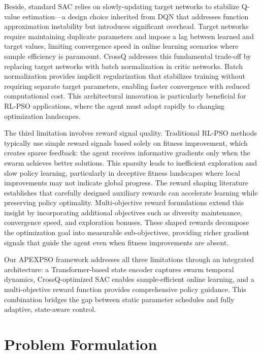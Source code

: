 \documentclass[fleqn,10pt]{wlscirep}
\begin{document}
Beside, standard SAC relies on slowly-updating target networks to stabilize Q-value estimation---a design choice inherited from DQN \cite{mnih2015dqn} that addresses function approximation instability but introduces significant overhead.
Target networks require maintaining duplicate parameters and impose a lag between learned and target values, limiting convergence speed in online learning scenarios where sample efficiency is paramount.
CrossQ \cite{crossq2023} addresses this fundamental trade-off by replacing target networks with batch normalization in critic networks.
Batch normalization provides implicit regularization that stabilizes training without requiring separate target parameters, enabling faster convergence with reduced computational cost.
This architectural innovation is particularly beneficial for RL-PSO applications, where the agent must adapt rapidly to changing optimization landscapes.

The third limitation involves reward signal quality.
Traditional RL-PSO methods typically use simple reward signals based solely on fitness improvement, which creates sparse feedback: the agent receives informative gradients only when the swarm achieves better solutions.
This sparsity leads to inefficient exploration and slow policy learning, particularly in deceptive fitness landscapes where local improvements may not indicate global progress.
The reward shaping literature \cite{ng1999policy} establishes that carefully designed auxiliary rewards can accelerate learning while preserving policy optimality.
Multi-objective reward formulations \cite{sener2018multitask, mannion2018reward} extend this insight by incorporating additional objectives such as diversity maintenance, convergence speed, and exploration bonuses.
These shaped rewards decompose the optimization goal into measurable sub-objectives, providing richer gradient signals that guide the agent even when fitness improvements are absent.

Our APEXPSO framework addresses all three limitations through an integrated architecture: a Transformer-based state encoder captures swarm temporal dynamics, CrossQ-optimized SAC enables sample-efficient online learning, and a multi-objective reward function provides comprehensive policy guidance.
This combination bridges the gap between static parameter schedules and fully adaptive, state-aware control.

\section*{Problem Formulation}
\label{sec:problem}
\end{document}
